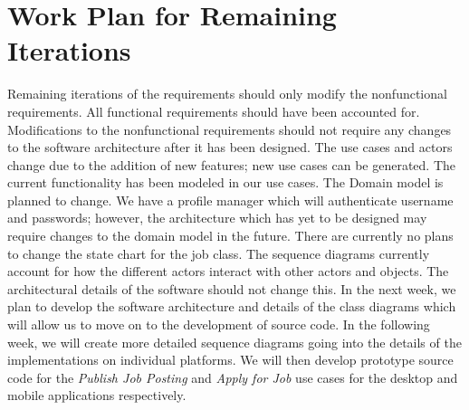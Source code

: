 \documentclass[12pt]{report}
\begin{document}
\chapter{Work Plan for Remaining Iterations}
Remaining iterations of the requirements should only modify the nonfunctional
requirements. All functional requirements should have been accounted for. Modifications to
the nonfunctional requirements should not require any changes to the software architecture
after it has been designed.
The use cases and actors change due to the addition of new features; new use cases can
be generated. The current functionality has been modeled in our use cases.
The Domain model is planned to change. We have a profile manager which will
authenticate username and passwords; however, the architecture which has yet to be designed
may require changes to the domain model in the future.
There are currently no plans to change the state chart for the job class.
The sequence diagrams currently account for how the different actors interact with
other actors and objects. The architectural details of the software should not change this.
In the next week, we plan to develop the software architecture and details of the class
diagrams which will allow us to move on to the development of source code.
In the following week, we will create more detailed sequence diagrams going into the
details of the implementations on individual platforms. We will then develop prototype source
code for the \textit{Publish Job Posting} and \textit{Apply for Job} use cases for the desktop and mobile
applications respectively.
\end{document}
